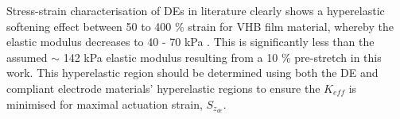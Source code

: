     Stress-strain characterisation of DEs in literature clearly shows a hyperelastic softening effect between 50 to 400 \% strain for VHB film material, whereby the elastic modulus decreases to 40 - 70 kPa\cite{Liu2018} . This is significantly less than the assumed $\sim$ 142 kPa elastic modulus resulting from a 10 \% pre-stretch in this work. This hyperelastic region should be determined using both the DE and compliant electrode materials' hyperelastic regions to ensure the $K_{e\!f\!f}$ is minimised for maximal actuation strain, $S_{z_{de}}$. 
	
	
